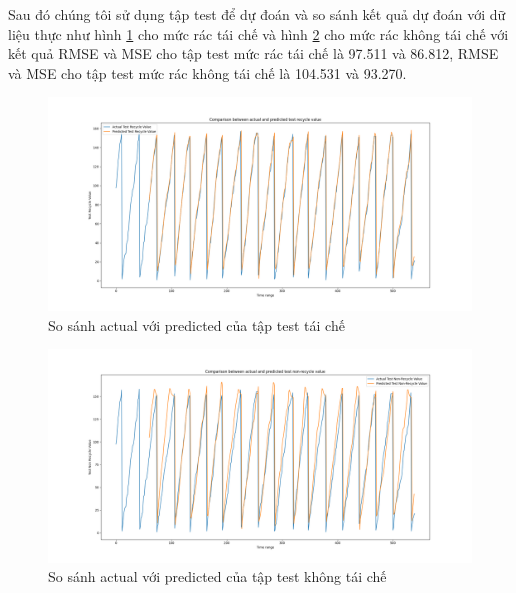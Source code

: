 Sau đó chúng tôi sử dụng tập test để dự đoán và so sánh kết quả dự đoán với dữ liệu thực như hình \ref{fig:test_recycle_actual_prediction} cho mức rác tái chế và hình \ref{fig:test_non_recycle_actual_prediction} cho mức rác không tái chế với kết quả RMSE và MSE cho tập test mức rác tái chế là 97.511 và 86.812, RMSE và MSE cho tập test mức rác không tái chế là 104.531 và 93.270.
\begin{figure}[H]
    \centering
    \includegraphics[width=\textwidth]{images/Khanh/Python/Recycle_Test_Chart.png}
    \caption{So sánh actual với predicted của tập test tái chế}
    \label{fig:test_recycle_actual_prediction}
\end{figure}
\begin{figure}[H]
    \centering
    \includegraphics[width=\textwidth]{images/Khanh/Python/Non-Recycle_Test_Chart.png}
    \caption{So sánh actual với predicted của tập test không tái chế}
    \label{fig:test_non_recycle_actual_prediction}
\end{figure}

